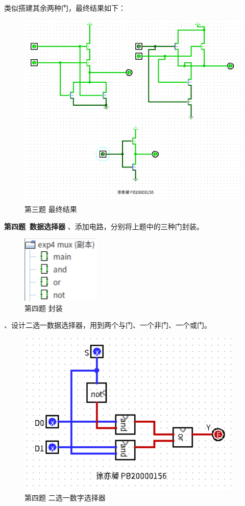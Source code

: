 \documentclass[UTF8]{ctexart}
\begin{document}
\newline
类似搭建其余两种门，最终结果如下：
\begin{figure}[h!]
    \centering
    \includegraphics[scale=0.6]{p3.PNG}
    \caption{第三题 最终结果}
\end{figure}
\newline
\textbf{第四题\ 数据选择器}
、添加电路，分别将上题中的三种门封装。
\begin{figure}[h!]
    \centering
    \includegraphics[scale=0.6]{p4_s1.PNG}
    \caption{第四题 封装}
\end{figure}
、设计二选一数据选择器，用到两个与门、一个非门、一个或门。
\begin{figure}[h!]
    \centering
    \includegraphics[scale=0.6]{p4_s2.PNG}
    \caption{第四题 二选一数字选择器}
\end{figure}
\end{document}
